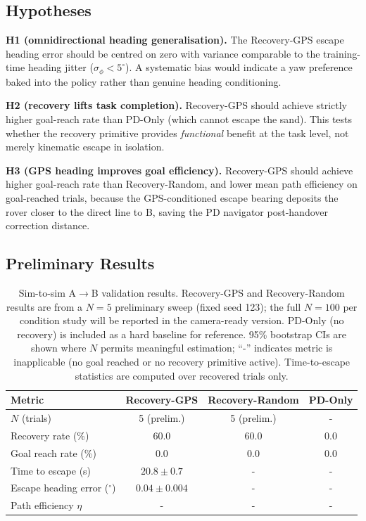 \documentclass[conference]{IEEEtran}
\begin{document}
\subsection{Hypotheses}

\textbf{H1 (omnidirectional heading generalisation).} The Recovery-GPS escape
heading error should be centred on zero with variance comparable to the
training-time heading jitter ($\sigma_\phi < 5^\circ$). A systematic bias would
indicate a yaw preference baked into the policy rather than genuine heading
conditioning.

\textbf{H2 (recovery lifts task completion).} Recovery-GPS should achieve
strictly higher goal-reach rate than PD-Only (which cannot escape the sand).
This tests whether the recovery primitive provides \emph{functional} benefit at
the task level, not merely kinematic escape in isolation.

\textbf{H3 (GPS heading improves goal efficiency).} Recovery-GPS should
achieve higher goal-reach rate than Recovery-Random, and lower mean path
efficiency on goal-reached trials, because the GPS-conditioned escape bearing
deposits the rover closer to the direct line to B, saving the PD navigator
post-handover correction distance.

\subsection{Preliminary Results}
\label{sec:sim2sim_results}

\begin{table}[!htbp]
  \centering
  \caption{Sim-to-sim A$\to$B validation results.
    Recovery-GPS and Recovery-Random results are from a $N=5$ preliminary sweep
    (fixed seed 123); the full $N=100$ per condition study will be reported in
    the camera-ready version. PD-Only (no recovery) is included as a hard
    baseline for reference. 95\% bootstrap CIs are shown where $N$ permits
    meaningful estimation; ``-'' indicates metric is inapplicable (no goal
    reached or no recovery primitive active). Time-to-escape statistics are
    computed over recovered trials only.}
  \label{tab:sim2sim}
  \renewcommand{\arraystretch}{1.2}
  \begin{tabular}{@{}lccc@{}}
    \toprule
    \textbf{Metric}
      & \textbf{Recovery-GPS}
      & \textbf{Recovery-Random}
      & \textbf{PD-Only} \\
    \midrule
    $N$ (trials)                    & 5 (prelim.) & 5 (prelim.) & - \\
    Recovery rate (\%)              & 60.0        & 60.0        & 0.0 \\
    Goal reach rate (\%)            & 0.0         & 0.0         & 0.0 \\
    Time to escape (s)              & $20.8 \pm 0.7$  & -     & - \\
    Escape heading error ($^\circ$) & $0.04 \pm 0.004$ & -    & - \\
    Path efficiency $\eta$          & -         & -         & - \\
    \bottomrule
  \end{tabular}
\end{table}
\end{document}
